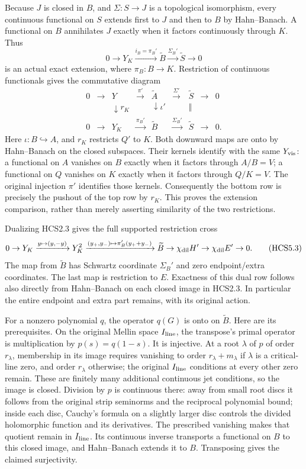 Because \(J\) is closed in \(B\), and \(\Sigma:S\to J\) is a topological
isomorphism, every continuous functional on \(S\) extends first to \(J\)
and then to \(B\) by Hahn--Banach. A functional on \(B\) annihilates
\(J\) exactly when it factors continuously through \(K\). Thus \[
0\to Y_K\xrightarrow{i_B=\pi_B'}\widetilde B
\xrightarrow{\Sigma_B'}\widetilde S\to0
\tag{HCS5.1}
\] is an actual exact extension, where \(\pi_B:B\to K\). Restriction of
continuous functionals gives the commutative diagram \[
\begin{array}{ccccccccc}
0&\to&Y&\xrightarrow{\pi'}&\widetilde A&
\xrightarrow{\Sigma'}&\widetilde S&\to&0\\
&&\downarrow r_K&&\downarrow\iota'&&\Vert\\
0&\to&Y_K&\xrightarrow{\pi_B'}&\widetilde B&
\xrightarrow{\Sigma_B'}&\widetilde S&\to&0.
\end{array}
\tag{HCS5.2}
\] Here \(\iota:B\hookrightarrow A\), and \(r_K\) restricts \(Q'\) to
\(K\). Both downward maps are onto by Hahn--Banach on the closed
subspaces. Their kernels identify with the same \(Y_{\rm vis}\): a
functional on \(A\) vanishes on \(B\) exactly when it factors through
\(A/B=V\); a functional on \(Q\) vanishes on \(K\) exactly when it
factors through \(Q/K=V\). The original injection \(\pi'\) identifies
those kernels. Consequently the bottom row is precisely the pushout of
the top row by \(r_K\). This proves the extension comparison, rather
than merely asserting similarity of the two restrictions.

Dualizing HCS2.3 gives the full supported restriction cross \[
0\to Y_K\xrightarrow{y\mapsto(y,-y)}Y_K^2
\xrightarrow{(y_+,y_-)\mapsto\pi_B'(y_++y_-)}
\widetilde B\to\chi_{\rm dil}H'
\to\chi_{\rm dil}E'\to0.
\tag{HCS5.3}
\] The map from \(\widetilde B\) has Schwartz coordinate \(\Sigma_B'\)
and zero endpoint/extra coordinates. The last map is restriction to
\(E\). Exactness of this dual row follows also directly from
Hahn--Banach on each closed image in HCS2.3. In particular the entire
endpoint and extra part remains, with its original action.

For a nonzero polynomial \(q\), the operator \(q(G)\) is onto on
\(\widetilde B\). Here are its prerequisites. On the original Mellin
space \(I_{\rm line}\), the transpose's primal operator is
multiplication by \(p(s)=q(1-s)\). It is injective. At a root
\(\lambda\) of \(p\) of order \(r_\lambda\), membership in its image
requires vanishing to order \(r_\lambda+m_\lambda\) if \(\lambda\) is a
critical-line zero, and order \(r_\lambda\) otherwise; the original
\(I_{\rm line}\) conditions at every other zero remain. These are
finitely many additional continuous jet conditions, so the image is
closed. Division by \(p\) is continuous there: away from small root
discs it follows from the original strip seminorms and the reciprocal
polynomial bound; inside each disc, Cauchy's formula on a slightly
larger disc controls the divided holomorphic function and its
derivatives. The prescribed vanishing makes that quotient remain in
\(I_{\rm line}\). Its continuous inverse transports a functional on
\(B\) to this closed image, and Hahn--Banach extends it to \(B\).
Transposing gives the claimed surjectivity.

